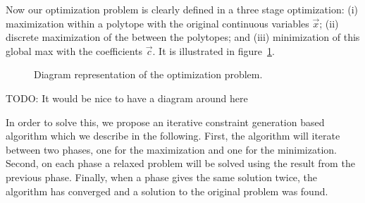 Now our optimization problem is clearly defined in a three stage optimization: (i) maximization within a polytope with the original continuous variables $\vec{x}$; (ii) discrete maximization of the between the polytopes; and (iii) minimization of this global max with the coefficients $\vec{c}$. It is illustrated in figure~\ref{fig:optim}.


\begin{figure}[h!t]
\center
{}
\caption{ Diagram representation of the optimization problem.}
\label{fig:optim} 
\end{figure}


{\large TODO: It would be nice to have a diagram around here}

In order to solve this, we propose an iterative constraint generation based algorithm which we describe in the following. First, the algorithm will iterate between two phases, one for the maximization and one for the minimization.  Second, on each phase a relaxed problem will be solved using the result from the previous phase. Finally, when a phase gives the same solution twice, the algorithm has converged and a solution to the original problem was found.

